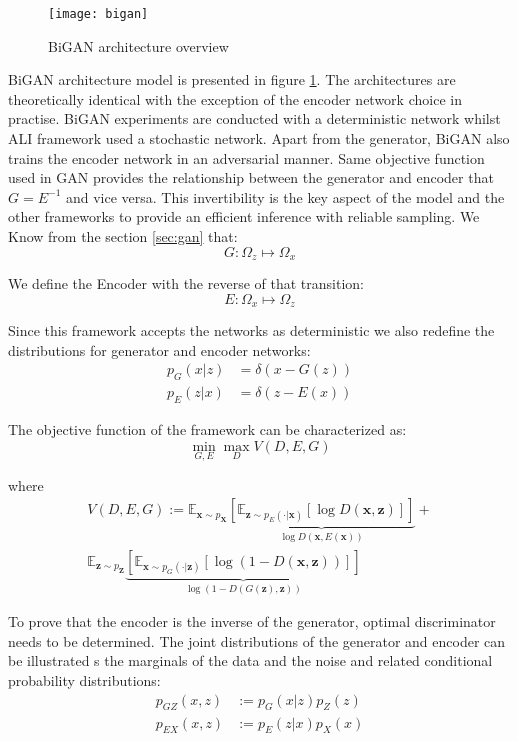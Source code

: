 \begin{figure}[h!]
	\centering
	\texttt{[image: bigan]}
    \caption{BiGAN architecture overview}
    \label{fig:bigan_model}
\end{figure}

BiGAN architecture model is presented in figure \ref{fig:bigan_model}. The architectures are
theoretically identical with the exception of the encoder network choice in practise. BiGAN
experiments are conducted with a deterministic network whilst ALI framework used a stochastic
network. Apart from the generator, BiGAN also trains the encoder network in an adversarial manner.
Same objective function used in GAN provides the relationship between the generator and encoder that
$G = E^{-1}$ and vice versa. This invertibility is the key aspect of the model and the other
frameworks to provide an efficient inference with reliable sampling. We Know from the section
\ref{sec:gan} that: 
$$
G : \Omega_{z} \mapsto \Omega_{x}
$$

We define the Encoder with the reverse of that transition:
$$
E : \Omega_{x} \mapsto \Omega_{z}
$$

Since this framework accepts the networks as deterministic we also redefine the distributions for
generator and encoder networks:
\begin{align*}
    p_G(x | z) & = \delta (x - G(z)) \\
    p_E(z | x) & = \delta (z - E(x))
\end{align*}

The objective function of the framework can be characterized as:
\begin{equation}
    \min _{G, E} \max _{D} V(D, E, G)
\end{equation}
 
where
\begin{multline}
    \label{eqn:bigan_v}
V(D, E, G) :=\mathbb{E}_{\mathbf{x} \sim p_{\mathbf{X}}}  \underbrace{\left[ \mathbb{E}_{\mathbf{z} \sim p_{E}(\cdot | \mathbf{x})}[\log D(\mathbf{x}, \mathbf{z})] \right]}_{\log D(\mathbf{x}, E(\mathbf{x}))} + \\ \mathbb{E}_{\mathbf{z} \sim p_{\mathbf{Z}}} \underbrace{  \left[ \mathbb{E}_{\mathbf{x} \sim p_{G}(\cdot | \mathbf{z})}[\log (1-D(\mathbf{x}, \mathbf{z}))] \right]}_{\log (1-D(G(\mathbf{z}), \mathbf{z}))}
\end{multline}

To prove that the encoder is the inverse of the generator, optimal discriminator needs to be
determined.\cite{Donahue2017AdversarialFL} The joint distributions of the generator and encoder can
be illustrated s the marginals of the data and the noise and related conditional probability
distributions:
\begin{align}
    \label{eqn:bigan_gz}
    p_{GZ} (x, z ) &:= p_G(x | z) p_{Z} (z) \\[5pt] 
    \label{eqn:bigan_ex}
    p_{EX} (x, z ) &:= p_E(z | x) p_{X} (x) 
\end{align}

